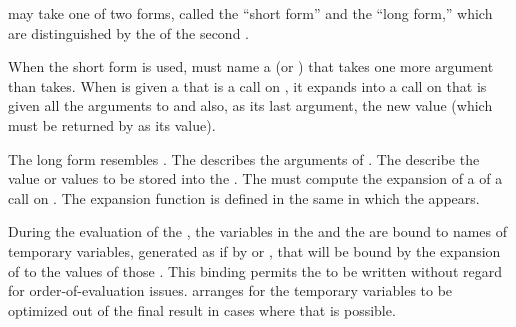  may take one of two forms, called the ``short form'' and the ``long form,''
which are distinguished by the  of the second .

When the short form is used, 
% 
{} must name 
a  (or ) that takes one more argument
than  takes.  When  is given a 
that is a call on , it expands into
a call on  that is given all the arguments to
 and also, as its last argument, the new value
(which must be returned by  as its value).

The long form  
% 
resembles .
The  describes the arguments of . 
The  describe the
value 
or values 
to be stored into the .
The  must
compute the expansion of a  of a call on .
The expansion function is defined in the same 
in which the   appears.

During the evaluation of the
, the variables in the  and the
are bound to names of temporary variables,
generated as if by 
or ,
that will be bound by the
expansion of  
to the values of those .  This binding
permits the
 to be written without regard for order-of-evaluation
issues.   arranges for the temporary variables to be
optimized out of the final result in cases where that is possible.  

